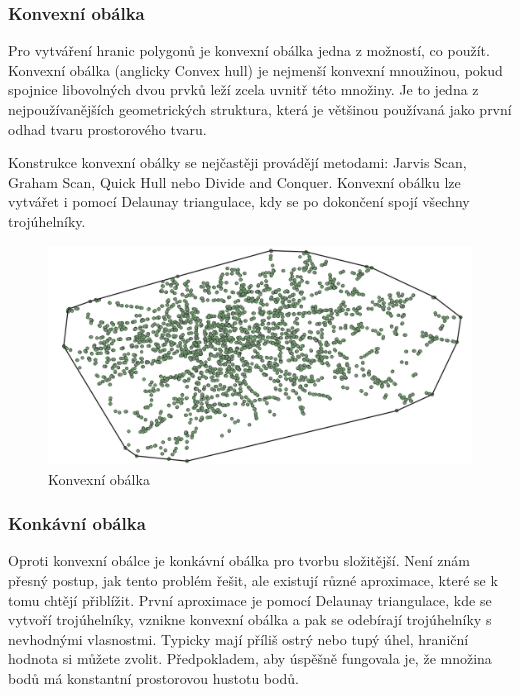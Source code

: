 \subsubsection{Konvexní obálka}
\label{konv_obalka}

Pro vytváření hranic polygonů je konvexní obálka jedna z možností, co použít. Konvexní obálka (anglicky Convex hull)
je nejmenší konvexní mnoužinou, pokud spojnice  libovolných dvou prvků leží zcela uvnitř této množiny.
Je to jedna z nejpoužívanějších geometrických struktura, která je většinou používaná jako první odhad tvaru
prostorového tvaru.

Konstrukce konvexní obálky se nejčastěji provádějí metodami: Jarvis Scan, Graham Scan, Quick Hull nebo
Divide and Conquer. Konvexní obálku lze vytvářet i pomocí Delaunay triangulace, kdy se po dokončení
spojí všechny trojúhelníky.

\begin{figure}[H] \centering
    \includegraphics[width=400pt]{./pictures/convexHull.png}
    \caption[Konvexní obálka]{Konvexní obálka}
	\label{fig:convexHull}              
\end{figure}

\subsubsection{Konkávní obálka}
\label{konk_obalka}
 
Oproti konvexní obálce je konkávní obálka pro tvorbu složitější. Není znám přesný postup,
jak tento problém řešit, ale existují různé aproximace, které se k tomu chtějí přiblížit.
První aproximace je pomocí Delaunay triangulace, kde se vytvoří trojúhelníky, vznikne
konvexní obálka a pak se odebírají trojúhelníky s nevhodnými vlasnostmi. Typicky mají příliš ostrý nebo tupý
úhel, hraniční hodnota si můžete zvolit.
Předpokladem, aby úspěšně fungovala je, že množina bodů má konstantní
prostorovou hustotu bodů.

